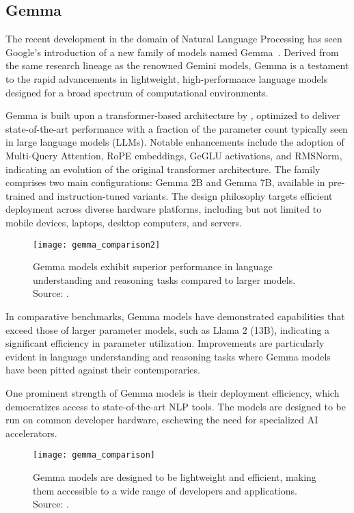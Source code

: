 \subsection{Gemma}
\label{subsec:gemma}

The recent development in the domain of Natural Language Processing has seen Google's introduction of a new family of models named Gemma~\cite{gemma_google_ai, gemmateam2024gemma}.
Derived from the same research lineage as the renowned Gemini models, Gemma is a testament to the rapid advancements in lightweight, high-performance language models designed for a broad spectrum of computational environments.

Gemma is built upon a transformer-based architecture by \textcite{vaswani2023attention}, optimized to deliver state-of-the-art performance with a fraction of the parameter count typically seen in large language models (LLMs).
Notable enhancements include the adoption of Multi-Query Attention, RoPE embeddings, GeGLU activations, and RMSNorm, indicating an evolution of the original transformer architecture.
The family comprises two main configurations: Gemma 2B and Gemma 7B, available in pre-trained and instruction-tuned variants.
The design philosophy targets efficient deployment across diverse hardware platforms, including but not limited to mobile devices, laptops, desktop computers, and servers.

\begin{figure}[ht!]
	\centering
	\texttt{[image: gemma\_comparison2]}
	\caption{Gemma models exhibit superior performance in language understanding and reasoning tasks compared to larger models. Source: \protect\textcite{gemmateam2024gemma}.}
	\label{fig:gemma-comparison2}
\end{figure}

In comparative benchmarks, Gemma models have demonstrated capabilities that exceed those of larger parameter models, such as Llama 2 (13B), indicating a significant efficiency in parameter utilization.
Improvements are particularly evident in language understanding and reasoning tasks where Gemma models have been pitted against their contemporaries.

One prominent strength of Gemma models is their deployment efficiency, which democratizes access to state-of-the-art NLP tools.
The models are designed to be run on common developer hardware, eschewing the need for specialized AI accelerators.

\begin{figure}[ht!]
	\centering
	\texttt{[image: gemma\_comparison]}
	\caption{Gemma models are designed to be lightweight and efficient, making them accessible to a wide range of developers and applications. Source: \protect\textcite{gemma_google_ai}.}
	\label{fig:gemma-comparison}
\end{figure}

